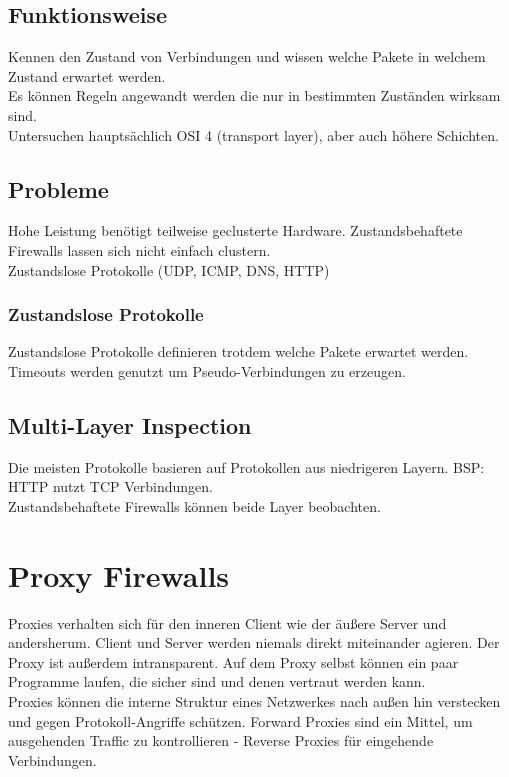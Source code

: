 \documentclass{article} %
\begin{document}
\subsection{Funktionsweise}
Kennen den Zustand von Verbindungen und wissen welche Pakete in welchem Zustand erwartet werden.\\
Es können Regeln angewandt werden die nur in bestimmten Zuständen wirksam sind.\\
Untersuchen hauptsächlich  OSI 4 (transport layer), aber auch höhere Schichten.\\
\subsection{Probleme}
Hohe Leistung benötigt teilweise geclusterte Hardware. Zustandsbehaftete Firewalls lassen sich nicht einfach clustern.\\
Zustandslose Protokolle (UDP, ICMP, DNS, HTTP)\\
\subsubsection{Zustandslose Protokolle}
Zustandslose Protokolle definieren trotdem welche Pakete erwartet werden.\\
Timeouts werden genutzt um Pseudo-Verbindungen zu erzeugen.\\
\subsection{Multi-Layer Inspection}
Die meisten Protokolle basieren auf Protokollen aus niedrigeren Layern. BSP: HTTP nutzt TCP Verbindungen.\\
Zustandsbehaftete Firewalls können beide Layer beobachten.


\section{Proxy Firewalls}
Proxies verhalten sich für den inneren Client wie der äußere Server und andersherum. Client und Server werden niemals direkt miteinander agieren. Der Proxy ist außerdem intransparent. Auf dem Proxy selbst können ein paar Programme laufen, die sicher sind und denen vertraut werden kann.\\
Proxies können die interne Struktur eines Netzwerkes nach außen hin verstecken und gegen Protokoll-Angriffe schützen. Forward Proxies sind ein Mittel, um ausgehenden Traffic zu kontrollieren - Reverse Proxies für eingehende Verbindungen.
\end{document}
